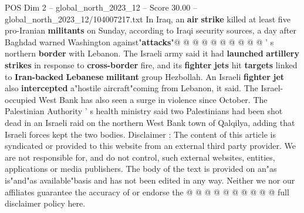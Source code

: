 \begin{textsample}{POS Dim 2 – global\_north\_2023\_12 – Score 30.00 – global\_north\_2023\_12/104007217.txt}
In Iraq, an \textbf{air} \textbf{strike} killed at least five pro-Iranian \textbf{militants} on Sunday, according to Iraqi security sources, a day after Baghdad warned Washington against"\textbf{attacks}"@ @ @ @ @ @ @ @ @ @ ' s northern \textbf{border} with Lebanon.
The Israeli army said it had \textbf{launched} \textbf{artillery} \textbf{strikes} in response to \textbf{cross-border} fire, and its \textbf{fighter} \textbf{jets} hit \textbf{targets} linked to \textbf{Iran-backed} \textbf{Lebanese} \textbf{militant} group Hezbollah.
An Israeli \textbf{fighter} \textbf{jet} also \textbf{intercepted} a"hostile aircraft"coming from Lebanon, it said.
The Israel-occupied West Bank has also seen a surge in violence since October.
The Palestinian Authority ' s health ministry said two Palestinians had been shot dead in an Israeli raid on the northern West Bank town of Qalqilya, adding that Israeli forces kept the two bodies.
Disclaimer : The content of this article is syndicated or provided to this website from an external third party provider.
We are not responsible for, and do not control, such external websites, entities, applications or media publishers.
The body of the text is provided on an"as is"and"as available"basis and has not been edited in any way.
Neither we nor our affiliates guarantee the accuracy of or endorse the @ @ @ @ @ @ @ @ @ @ full disclaimer policy here.

\end{textsample}
